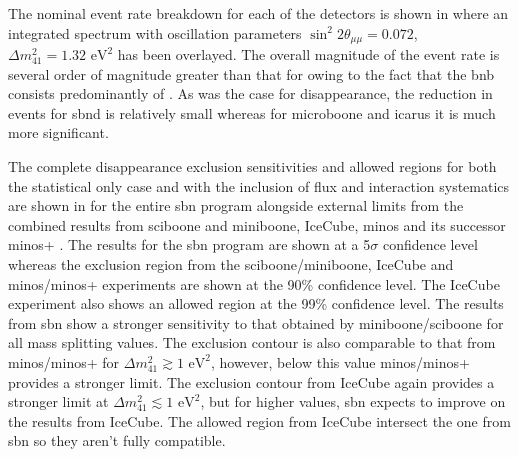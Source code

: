 The nominal event rate breakdown for each of the detectors is shown in  where an integrated spectrum with oscillation parameters $\sin^2{2\theta_{\mu \mu}} = 0.072$, $\Delta m^2_{41} = 1.32 \text{ eV}^2$ has been overlayed. The overall magnitude of the event rate is several order of magnitude greater than that for \nue owing to the fact that the \gls{bnb} consists predominantly of \numu. As was the case for \nue disappearance, the reduction in events for \gls{sbnd} is relatively small whereas for \gls{microboone} and \gls{icarus} it is much more significant.

The complete \numu disappearance exclusion sensitivities and allowed regions for both the statistical only case and with the inclusion of flux and interaction systematics are shown in  for the entire \gls{sbn} program alongside external limits from the combined results from \gls{sciboone} and \gls{miniboone}, IceCube, \gls{minos} and its successor \gls{minos}+ \cite{MiniBooNE/SciBooNE_numu_disapp_contour} \cite{IceCube_numu_disapp_contour}\cite{MINOS}\cite{MINOS+}. The results for the \gls{sbn} program are shown at a 5$\sigma$ confidence level whereas the exclusion region from the \gls{sciboone}/\gls{miniboone}, IceCube and \gls{minos}/\gls{minos}+ experiments are shown at the 90\% confidence level. The IceCube experiment also shows an allowed region at the 99\% confidence level. The results from \gls{sbn} show a stronger sensitivity to that obtained by \gls{miniboone}/\gls{sciboone} for all mass splitting values. The exclusion contour is also comparable to that from \gls{minos}/\gls{minos}+ for $\Delta m^2_{41} \gtrsim 1\text{ eV}^2$, however, below this value \gls{minos}/\gls{minos}+ provides a stronger limit. The exclusion contour from IceCube again provides a stronger limit at $\Delta m^2_{41} \lesssim 1\text{ eV}^2$, but for higher values, \gls{sbn} expects to improve on the results from IceCube. The allowed region from IceCube intersect the one from \gls{sbn} so they aren't fully compatible. 

